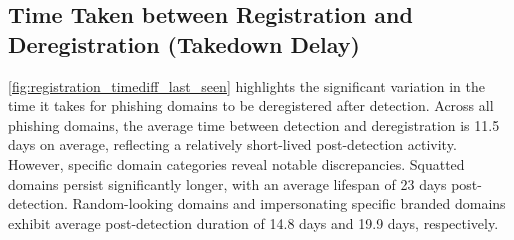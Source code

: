 \subsection{Time Taken between Registration and Deregistration (Takedown Delay)}
\label{sec:registration_deregistration}
\autoref{fig:registration_timediff_last_seen} highlights the significant variation in the time it takes for phishing domains to be deregistered after detection. 
Across all phishing domains, the average time between detection and deregistration is 11.5 days on average, reflecting a relatively short-lived post-detection activity. 
However, specific domain categories reveal notable discrepancies. 
Squatted domains
persist significantly longer, with an average lifespan of 23 days post-detection.
Random-looking domains and impersonating specific branded domains exhibit average post-detection duration of 14.8 days and 19.9 days, respectively.

